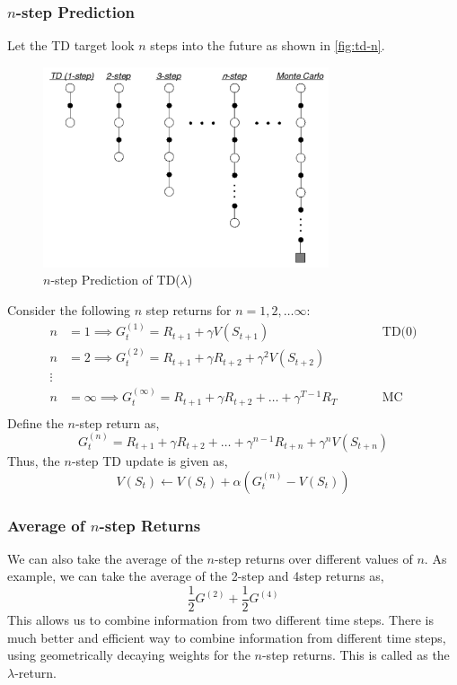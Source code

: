 \subsubsection{\(n\)-step Prediction}
Let the TD target look \(n\) steps into the future as shown in \autoref{fig:td-n}.
\begin{figure}[H]
    \centering
    \includegraphics[width=0.75\textwidth]{figures/td-n.png}
    \caption{\(n\)-step Prediction of TD(\(\lambda \))}
    \label{fig:td-n}
\end{figure}
Consider the following \(n\) step returns for \(n = 1, 2, \dots \infty \):
\[
    \begin{aligned}
        n & = 1 \implies  G_t^{(1)} = R_{t+1} + \gamma V(S_{t+1}) &&\qquad \text{TD(0)} \\
        n & = 2 \implies  G_t^{(2)} = R_{t+1} + \gamma R_{t+2} + \gamma^2 V(S_{t+2}) \\
        \vdots \\
        n & = \infty \implies  G_t^{(\infty)} = R_{t+1} + \gamma R_{t+2} + \dots + \gamma^{T-1}R_T
        &&\qquad \text{MC} \\
    \end{aligned}
\]
Define the \(n\)-step return as,
\[
    G_t^{(n)} = R_{t+1} + \gamma R_{t+2} + \dots + \gamma^{n-1}R_{t+n} + \gamma^n V(S_{t+n})
\]
Thus, the \(n\)-step TD update is given as,
\[
    V(S_t) \leftarrow V(S_t) + \alpha\left( 
        G_t^{(n)} - V(S_t)
     \right)
\]

\subsubsection*{Average of \(n\)-step Returns}
We can also take the average of the \(n\)-step returns over different values of \(n\).
As example, we can take the average of the 2-step and 4step returns as,
\[
    \frac{1}{2}G^{(2)} + \frac{1}{2}G^{(4)}
\]
This allows us to combine information from two different time steps. There is much better
and efficient way to combine information from different time steps, using geometrically
decaying weights for the \(n\)-step returns. This is called as the \(\lambda\)-return.

